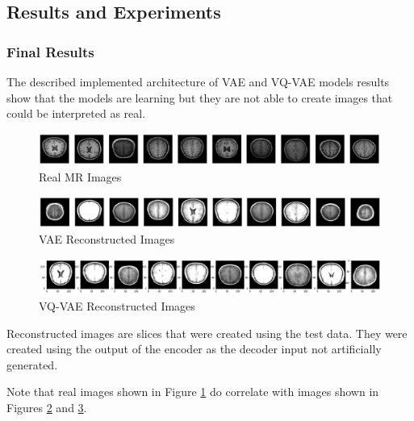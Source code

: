 \newpage 

\subsection{Results and Experiments}

\subsubsection{Final Results}

The described implemented architecture of VAE and VQ-VAE models results show that the models are learning but they are not able to create images that could be interpreted as real.

\begin{figure}[ht]
    \centering
    \includegraphics[width = 17cm]{images/mri-real-images.png}
    \caption[Real MR Images]{Real MR Images}
    \label{fig:mri-real-images}
\end{figure}

\begin{figure}[ht]
    \centering
    \includegraphics[width = 17cm]{images/vae-brains-results.png}
    \caption[VAE Reconstructed Images]{VAE Reconstructed Images}
    \label{fig:vae-brains-results}
\end{figure}

\begin{figure}[ht]
    \centering
    \includegraphics[width = 17cm]{images/vqvae-brains-results.png}
    \caption[VQ-VAE Reconstructed Images]{VQ-VAE Reconstructed Images}
    \label{fig:vqvae-brains-results}
\end{figure}

Reconstructed images are slices that were created using the test data. They were created using the output of the encoder as the decoder input not artificially generated.

Note that real images shown in Figure \ref{fig:mri-real-images} do correlate with images shown in Figures \ref{fig:vae-brains-results} and \ref{fig:vqvae-brains-results}.

